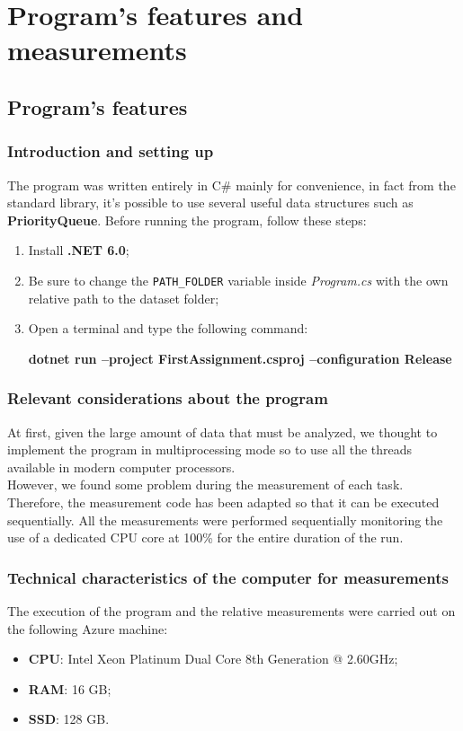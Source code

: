 \section{Program's features and measurements}

\subsection{Program's features}

\subsubsection{Introduction and setting up}
The program was written entirely in C\# mainly for convenience, in fact from the standard library, it's possible to 
use several useful data structures such as \textbf{PriorityQueue}.
Before running the program, follow these steps:
\begin{enumerate}
    \item Install \textbf{.NET 6.0};
    \item Be sure to change the \verb|PATH_FOLDER| variable inside \textit{Program.cs} with the own relative path to the dataset folder;
    \item Open a terminal and type the following command:\\
        \centerline{\textbf{dotnet run --project FirstAssignment.csproj --configuration Release}}
\end{enumerate}

\subsubsection{Relevant considerations about the program}
At first, given the large amount of data that must be analyzed, we thought to implement the program in multiprocessing
mode so to use all the threads available in modern computer processors. \\
\noindent
However, we found some problem during the measurement of each task.
Therefore, the measurement code has been adapted so that it can be executed sequentially.
All the measurements were performed sequentially monitoring the use of a dedicated CPU core at 100\% for the entire 
duration of the run.

\subsubsection{Technical characteristics of the computer for measurements}
The execution of the program and the relative measurements were carried out on the following Azure machine:
\begin{itemize}
    \item \textbf{CPU}: Intel Xeon Platinum Dual Core 8th Generation @ 2.60GHz;
    \item \textbf{RAM}: 16 GB;
    \item \textbf{SSD}: 128 GB.
\end{itemize}

